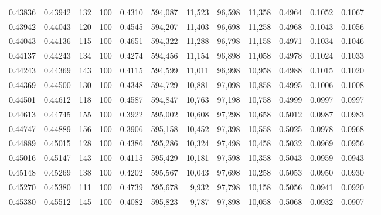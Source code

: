 \begin{tabular}{rrrrrrrrrrrrr}
0.43836 & 0.43942 &   132 & 100 &                                     0.4310 & 594,087 &  11,523 &  96,598 &  11,358 & 0.4964 & 0.1052 & 0.1067 \\
0.43942 & 0.44043 &   120 & 100 &                                     0.4545 & 594,207 &  11,403 &  96,698 &  11,258 & 0.4968 & 0.1043 & 0.1056 \\
0.44043 & 0.44136 &   115 & 100 &                                     0.4651 & 594,322 &  11,288 &  96,798 &  11,158 & 0.4971 & 0.1034 & 0.1046 \\
0.44137 & 0.44243 &   134 & 100 &                                     0.4274 & 594,456 &  11,154 &  96,898 &  11,058 & 0.4978 & 0.1024 & 0.1033 \\
0.44243 & 0.44369 &   143 & 100 &                                     0.4115 & 594,599 &  11,011 &  96,998 &  10,958 & 0.4988 & 0.1015 & 0.1020 \\
0.44369 & 0.44500 &   130 & 100 &                                     0.4348 & 594,729 &  10,881 &  97,098 &  10,858 & 0.4995 & 0.1006 & 0.1008 \\
0.44501 & 0.44612 &   118 & 100 &                                     0.4587 & 594,847 &  10,763 &  97,198 &  10,758 & 0.4999 & 0.0997 & 0.0997 \\
0.44613 & 0.44745 &   155 & 100 &                                     0.3922 & 595,002 &  10,608 &  97,298 &  10,658 & 0.5012 & 0.0987 & 0.0983 \\
0.44747 & 0.44889 &   156 & 100 &                                     0.3906 & 595,158 &  10,452 &  97,398 &  10,558 & 0.5025 & 0.0978 & 0.0968 \\
0.44889 & 0.45015 &   128 & 100 &                                     0.4386 & 595,286 &  10,324 &  97,498 &  10,458 & 0.5032 & 0.0969 & 0.0956 \\
0.45016 & 0.45147 &   143 & 100 &                                     0.4115 & 595,429 &  10,181 &  97,598 &  10,358 & 0.5043 & 0.0959 & 0.0943 \\
0.45148 & 0.45269 &   138 & 100 &                                     0.4202 & 595,567 &  10,043 &  97,698 &  10,258 & 0.5053 & 0.0950 & 0.0930 \\
0.45270 & 0.45380 &   111 & 100 &                                     0.4739 & 595,678 &   9,932 &  97,798 &  10,158 & 0.5056 & 0.0941 & 0.0920 \\
0.45380 & 0.45512 &   145 & 100 &                                     0.4082 & 595,823 &   9,787 &  97,898 &  10,058 & 0.5068 & 0.0932 & 0.0907 \\

\end{tabular}
